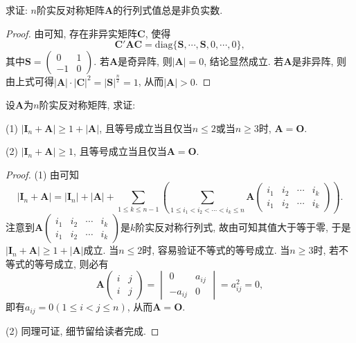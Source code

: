\documentclass[../../main.tex]{subfiles}
\begin{document}
\begin{proposition}\label{proposition:实反称矩阵的行列式必非负}
求证: $n$阶实反对称矩阵$\boldsymbol{A}$的行列式值总是非负实数.
\end{proposition}
\begin{proof}
由可知, 存在非异实矩阵$\boldsymbol{C}$, 使得
\[
\boldsymbol{C}'\boldsymbol{A}\boldsymbol{C}=\text{diag}\{\boldsymbol{S}, \cdots, \boldsymbol{S}, 0, \cdots, 0\},
\]
其中$\boldsymbol{S}=\begin{pmatrix}
0 & 1 \\
-1 & 0
\end{pmatrix}$. 若$\boldsymbol{A}$是奇异阵, 则$|\boldsymbol{A}| = 0$, 结论显然成立. 若$\boldsymbol{A}$是非异阵, 则由上式可得$|\boldsymbol{A}|\cdot|\boldsymbol{C}|^2 = |\boldsymbol{S}|^{\frac{n}{2}} = 1$, 从而$|\boldsymbol{A}|>0$. 
\end{proof}

\begin{proposition}\label{proposition:反称矩阵A的I_n+A的行列式相关结论}
设$\boldsymbol{A}$为$n$阶实反对称矩阵, 求证:

(1) $|\boldsymbol{I}_n+\boldsymbol{A}|\geq 1 + |\boldsymbol{A}|$, 且等号成立当且仅当$n\leq 2$或当$n\geq 3$时, $\boldsymbol{A}=\boldsymbol{O}$.

(2) $|\boldsymbol{I}_n+\boldsymbol{A}|\geq 1$, 且等号成立当且仅当$\boldsymbol{A}=\boldsymbol{O}$.
\end{proposition}
\begin{proof}
(1) 由可知
\[
|\boldsymbol{I}_n+\boldsymbol{A}| = |\boldsymbol{I}_n|+|\boldsymbol{A}|+\sum_{1\leq k\leq n - 1}\left(\sum_{1\leq i_1 < i_2 < \cdots < i_k\leq n} \boldsymbol{A}\begin{pmatrix}
i_1 & i_2 & \cdots & i_k \\
i_1 & i_2 & \cdots & i_k
\end{pmatrix}\right).
\]
注意到$\boldsymbol{A}\begin{pmatrix}
i_1 & i_2 & \cdots & i_k \\
i_1 & i_2 & \cdots & i_k
\end{pmatrix}$是$k$阶实反对称行列式, 故由可知其值大于等于零, 于是$|\boldsymbol{I}_n+\boldsymbol{A}|\geq 1 + |\boldsymbol{A}|$成立. 当$n\leq 2$时, 容易验证不等式的等号成立. 当$n\geq 3$时, 若不等式的等号成立, 则必有
\[
\boldsymbol{A}\begin{pmatrix}
i & j \\
i & j
\end{pmatrix}=\begin{vmatrix}
0 & a_{ij} \\
-a_{ij} & 0
\end{vmatrix}=a_{ij}^2 = 0,
\]
即有$a_{ij} = 0 (1\leq i < j\leq n)$, 从而$\boldsymbol{A}=\boldsymbol{O}$.

(2) 同理可证, 细节留给读者完成. 
\end{proof}
\end{document}
